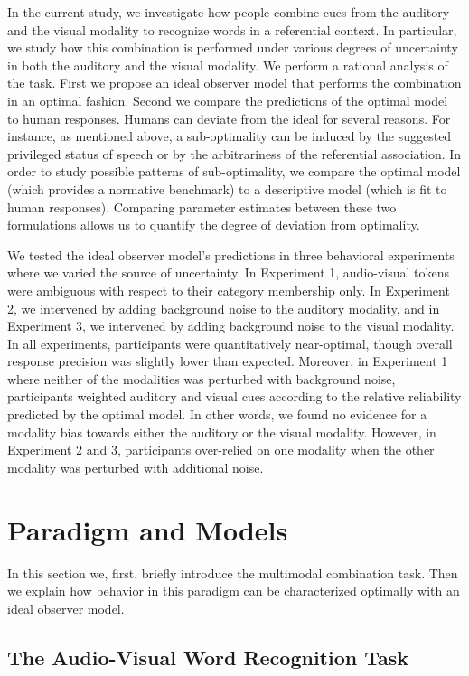 \documentclass[english,floatsintext,man]{apa6}
\theoremstyle{definition}
\theoremstyle{definition}
\theoremstyle{definition}
\theoremstyle{remark}
\begin{document}
In the current study, we investigate how people combine cues from the
auditory and the visual modality to recognize words in a referential
context. In particular, we study how this combination is performed under
various degrees of uncertainty in both the auditory and the visual
modality. We perform a rational analysis of the task. First we propose
an ideal observer model that performs the combination in an optimal
fashion. Second we compare the predictions of the optimal model to human
responses. Humans can deviate from the ideal for several reasons. For
instance, as mentioned above, a sub-optimality can be induced by the
suggested privileged status of speech or by the arbitrariness of the
referential association. In order to study possible patterns of
sub-optimality, we compare the optimal model (which provides a normative
benchmark) to a descriptive model (which is fit to human responses).
Comparing parameter estimates between these two formulations allows us
to quantify the degree of deviation from optimality.

We tested the ideal observer model's predictions in three behavioral
experiments where we varied the source of uncertainty. In Experiment 1,
audio-visual tokens were ambiguous with respect to their category
membership only. In Experiment 2, we intervened by adding background
noise to the auditory modality, and in Experiment 3, we intervened by
adding background noise to the visual modality. In all experiments,
participants were quantitatively near-optimal, though overall response
precision was slightly lower than expected. Moreover, in Experiment 1
where neither of the modalities was perturbed with background noise,
participants weighted auditory and visual cues according to the relative
reliability predicted by the optimal model. In other words, we found no
evidence for a modality bias towards either the auditory or the visual
modality. However, in Experiment 2 and 3, participants over-relied on
one modality when the other modality was perturbed with additional
noise.

\section{Paradigm and Models}\label{paradigm-and-models}

In this section we, first, briefly introduce the multimodal combination
task. Then we explain how behavior in this paradigm can be characterized
optimally with an ideal observer model.

\subsection{The Audio-Visual Word Recognition
Task}\label{the-audio-visual-word-recognition-task}
\end{document}
